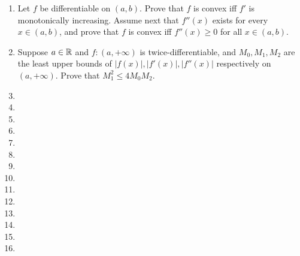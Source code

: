\begin{enumerate}[1.]
\item %
    Let $f$ be differentiable on $(a, b)$. Prove that $f$ is convex iff $f'$ is monotonically increasing. Assume next that $f''(x)$ exists for every $x \in (a, b)$, and prove that $f$ is convex iff $f''(x) \ge 0$ for all $x \in (a, b)$.
\item %
    Suppose $a \in \mathbb{R}$ and $f: (a, +\infty)$ is twice-differentiable, and $M_0, M_1, M_2$ are the least upper bounds of $|f(x)|, |f'(x)|, |f''(x)|$ respectively on $(a, +\infty)$. Prove that $M_1^2 \le 4M_0M_2$.
\item %
\item %
\item %
\item %
\item %
\item %
\item %
\item %
\item %
\item %
\item %
\item %
\item %
\item %

\end{enumerate}
